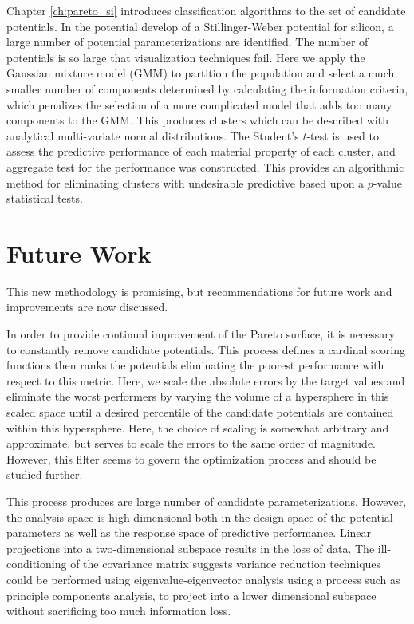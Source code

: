 Chapter \ref{ch:pareto_si} introduces classification algorithms to the set of candidate potentials.  In the potential develop of a Stillinger-Weber potential for silicon, a large number of potential parameterizations are identified.  The number of potentials is so large that visualization techniques fail.  Here we apply the Gaussian mixture model (GMM) to partition the population and select a much smaller number of components determined by calculating the information criteria, which penalizes the selection of a more complicated model that adds too many components to the GMM.  This produces clusters which can be described with analytical multi-variate normal distributions.  The Student's $t$-test is used to assess the predictive performance of each material property of each cluster, and aggregate test for the performance was constructed.  This provides an algorithmic method for eliminating clusters with undesirable predictive based upon a $p$-value statistical tests.

\section{Future Work}

This new methodology is promising, but recommendations for future work and improvements are now discussed.

In order to provide continual improvement of the Pareto surface, it is necessary to constantly remove candidate potentials.  This process defines a cardinal scoring functions then ranks the potentials eliminating the poorest performance with respect to this metric.  Here, we scale the absolute errors by the target values and eliminate the worst performers by varying the volume of a hypersphere in this scaled space until a desired percentile of the candidate potentials are contained within this hypersphere.  Here, the choice of scaling is somewhat arbitrary and approximate, but serves to scale the errors to the same order of magnitude.  However, this filter seems to govern the optimization process and should be studied further.

This process produces are large number of candidate parameterizations.  However, the analysis space is high dimensional both in the design space of the potential parameters as well as the response space of predictive performance.  Linear projections into a two-dimensional subspace results in the loss of data.  The ill-conditioning of the covariance matrix suggests variance reduction techniques could be performed using eigenvalue-eigenvector analysis using a process such as principle components analysis, to project into a lower dimensional subspace without sacrificing too much information loss.

